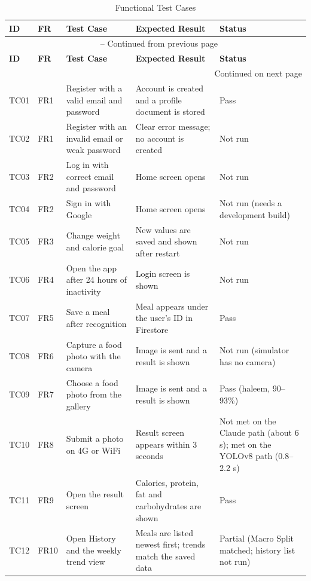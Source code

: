 \begin{longtable}{|l|l|>{\raggedright\arraybackslash}p{3.7cm}|>{\raggedright\arraybackslash}p{3.2cm}|>{\raggedright\arraybackslash}p{2.6cm}|}
\caption{Functional Test Cases}\label{tab:tc}\\
\hline
\textbf{ID} & \textbf{FR} & \textbf{Test Case} & \textbf{Expected Result} & \textbf{Status} \\ \hline
\endfirsthead
\multicolumn{5}{c}{\tablename\ \thetable{} -- Continued from previous page}\\ \hline
\textbf{ID} & \textbf{FR} & \textbf{Test Case} & \textbf{Expected Result} & \textbf{Status} \\ \hline
\endhead
\hline \multicolumn{5}{r}{Continued on next page}\\
\endfoot
\hline
\endlastfoot
TC01 & FR1 & Register with a valid email and password & Account is created and a profile document is stored & Pass \\ \hline
TC02 & FR1 & Register with an invalid email or weak password & Clear error message; no account is created & Not run \\ \hline
TC03 & FR2 & Log in with correct email and password & Home screen opens & Not run \\ \hline
TC04 & FR2 & Sign in with Google & Home screen opens & Not run (needs a development build) \\ \hline
TC05 & FR3 & Change weight and calorie goal & New values are saved and shown after restart & Not run \\ \hline
TC06 & FR4 & Open the app after 24 hours of inactivity & Login screen is shown & Not run \\ \hline
TC07 & FR5 & Save a meal after recognition & Meal appears under the user's ID in Firestore & Pass \\ \hline
TC08 & FR6 & Capture a food photo with the camera & Image is sent and a result is shown & Not run (simulator has no camera) \\ \hline
TC09 & FR7 & Choose a food photo from the gallery & Image is sent and a result is shown & Pass (haleem, 90--93\%) \\ \hline
TC10 & FR8 & Submit a photo on 4G or WiFi & Result screen appears within 3 seconds & Not met on the Claude path (about 6 s); met on the YOLOv8 path (0.8--2.2 s) \\ \hline
TC11 & FR9 & Open the result screen & Calories, protein, fat and carbohydrates are shown & Pass \\ \hline
TC12 & FR10 & Open History and the weekly trend view & Meals are listed newest first; trends match the saved data & Partial (Macro Split matched; history list not run) \\ \hline

\end{longtable}
